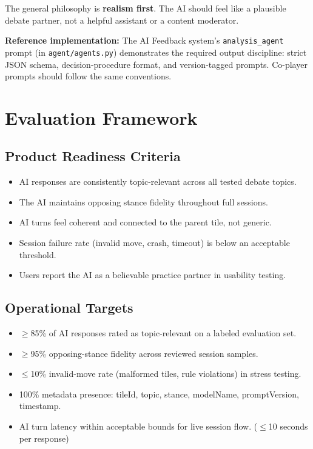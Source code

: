\documentclass[11pt]{article}
\begin{document}
The general philosophy is \textbf{realism first}. The AI should feel like a plausible debate
partner, not a helpful assistant or a content moderator.

\textbf{Reference implementation:} The AI Feedback system's \texttt{analysis\_agent} prompt
(in \texttt{agent/agents.py}) demonstrates the required output discipline: strict JSON schema,
decision-procedure format, and version-tagged prompts. Co-player prompts should follow the
same conventions.

\section{Evaluation Framework}

\subsection{Product Readiness Criteria}

\begin{itemize}
  \item AI responses are consistently topic-relevant across all tested debate topics.
  \item The AI maintains opposing stance fidelity throughout full sessions.
  \item AI turns feel coherent and connected to the parent tile, not generic.
  \item Session failure rate (invalid move, crash, timeout) is below an acceptable threshold.
  \item Users report the AI as a believable practice partner in usability testing.
\end{itemize}

\subsection{Operational Targets}

\begin{itemize}
  \item $\geq$85\% of AI responses rated as topic-relevant on a labeled evaluation set.
  \item $\geq$95\% opposing-stance fidelity across reviewed session samples.
  \item $\leq$10\% invalid-move rate (malformed tiles, rule violations) in stress testing.
  \item 100\% metadata presence: tileId, topic, stance, modelName, promptVersion, timestamp.
  \item AI turn latency within acceptable bounds for live session flow. ($\leq$10 seconds per response)
\end{itemize}
\end{document}
